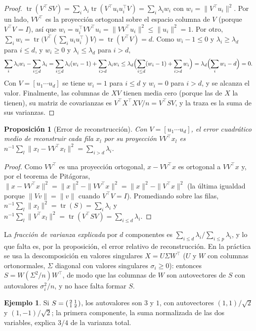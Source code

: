 \documentclass[11pt,a4paper]{article}
\theoremstyle{plain}
\newtheorem{proposicion}[teorema]{Proposición}
\theoremstyle{definition}
\newtheorem{ejemplo}[teorema]{Ejemplo}
\theoremstyle{remark}
\newcommand{\tr}{\operatorname{tr}}
\newcommand{\1}{\mathbf{1}}
\begin{document}
\begin{proof}
$\tr(V^\top SV)=\sum_i\lambda_i\tr(V^\top u_iu_i^\top V)=\sum_i\lambda_iw_i$
con $w_i=\|V^\top u_i\|^2$. Por un lado, $VV^\top$ es la proyección
ortogonal sobre el espacio columna de $V$ (porque $V^\top V=I$), así que
$w_i=u_i^\top VV^\top u_i=\|VV^\top u_i\|^2\le\|u_i\|^2=1$. Por otro,
$\sum_iw_i=\tr\bigl(V^\top(\sum_iu_iu_i^\top)V\bigr)=\tr(V^\top V)=d$.
Como $w_i-1\le0$ y $\lambda_i\ge\lambda_d$ para $i\le d$, y $w_i\ge0$ y
$\lambda_i\le\lambda_d$ para $i>d$,
\[
\sum_i\lambda_iw_i-\sum_{i\le d}\lambda_i=\sum_{i\le
d}\lambda_i(w_i-1)+\sum_{i>d}\lambda_iw_i\le\lambda_d\Bigl(\sum_{i\le
d}(w_i-1)+\sum_{i>d}w_i\Bigr)=\lambda_d\Bigl(\sum_iw_i-d\Bigr)=0 .
\]
Con $V=[u_1\cdots u_d]$ se tiene $w_i=1$ para $i\le d$ y $w_i=0$ para
$i>d$, y se alcanza el valor. Finalmente, las columnas de $XV$ tienen
media cero (porque las de $X$ la tienen), su matriz de covarianzas es
$V^\top X^\top XV/n=V^\top SV$, y la traza es la suma de sus varianzas.
\end{proof}

\begin{proposicion}[Error de reconstrucción]\label{prop:reconst}
Con $V=[u_1\cdots u_d]$, el error cuadrático medio de reconstruir cada fila
$x_l$ por su proyección $VV^\top x_l$ es
$n^{-1}\sum_l\|x_l-VV^\top x_l\|^2=\sum_{i>d}\lambda_i$.
\end{proposicion}

\begin{proof}
Como $VV^\top$ es una proyección ortogonal, $x-VV^\top x$ es ortogonal a
$VV^\top x$ y, por el teorema de Pitágoras,
$\|x-VV^\top x\|^2=\|x\|^2-\|VV^\top x\|^2=\|x\|^2-\|V^\top x\|^2$ (la última
igualdad porque $\|Vv\|=\|v\|$ cuando $V^\top V=I$). Promediando sobre las filas,
$n^{-1}\sum_l\|x_l\|^2=\tr(S)=\sum_i\lambda_i$ y
$n^{-1}\sum_l\|V^\top x_l\|^2=\tr(V^\top SV)=\sum_{i\le d}\lambda_i$.
\end{proof}

La \emph{fracción de varianza explicada} por $d$ componentes es
$\sum_{i\le d}\lambda_i/\sum_{i\le p}\lambda_i$, y lo que falta es, por la
proposición, el error relativo de reconstrucción. En la práctica se usa la
descomposición en valores singulares $X=U\Sigma W^\top$ ($U$ y $W$ con
columnas ortonormales, $\Sigma$ diagonal con valores singulares
$\sigma_i\ge0$): entonces $S=W(\Sigma^2/n)W^\top$, de modo que las
columnas de $W$ son autovectores de $S$ con autovalores $\sigma_i^2/n$, y
no hace falta formar $S$.

\begin{ejemplo}
Si $S=\begin{psmallmatrix}2&1\\1&2\end{psmallmatrix}$, los autovalores son
$3$ y $1$, con autovectores $(1,1)/\sqrt2$ y $(1,-1)/\sqrt2$; la primera
componente, la suma normalizada de las dos variables, explica $3/4$ de la
varianza total.
\end{ejemplo}
\end{document}
